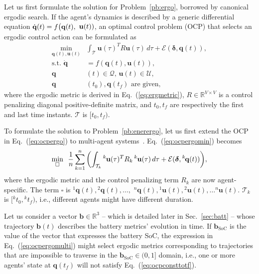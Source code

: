 \documentclass[lettersize,journal,twoside]{IEEEtran}
\theoremstyle{definition}
\begin{document}
Let us first formulate the solution for Problem~\ref{pb:ergo}, borrowed by canonical ergodic search.
If the agent's dynamics is described by a generic differential equation $\dot{\mathbf{q}}(t)=f\big({\small\mathbf{q}(t),}$ ${\small\mathbf{u}(t)})$, an optimal control problem (OCP) that selects an ergodic control action can be formulated as~\cite{ayvali2017ergodic}
\begin{subequations}\label{eq:ocpergo}\begin{align}
  \min_{\mathbf{q}(t),\mathbf{u}(t)}&\int_{\mathcal{T}}\mathbf{u}(\tau)^TR\mathbf{u}(\tau)\,d\tau+{\mathcal{E}(\boldsymbol{\delta},\mathbf{q}(t))},\label{eq:ocpergomin}\\
  \text{s.t. }\dot{\mathbf{q}}&=f(\mathbf{q}(t),\mathbf{u}(t)),\\
  \mathbf{q}&(t)\in\mathcal{Q},\,\mathbf{u}(t)\in\mathcal{U},\\
  \mathbf{q}&(t_0), \mathbf{q}(t_f)\text{ are given},\label{eq:ocpconsttotf}
\end{align}\end{subequations}
where the ergodic metric is derived in Eq.~(\ref{eq:ergmetric}), $R\in\mathbb{R}^{V\times V}$ is a control penalizing diagonal positive-definite matrix, and $t_0, t_f$ are respectively the first and last time instants. 
$\mathcal{T}$ is $[t_0, t_f)$.

To formulate the solution to Problem~\ref{pb:enerergo}, let us first extend the OCP in Eq.~(\ref{eq:ocpergo}) to multi-agent systems~\cite{coffin2022multi}. Eq.~(\ref{eq:ocpergomin}) becomes
\begin{equation}\label{eq:ocpergomulti}
  \min_{\square}\,\,\,{\frac{1}{n}\sum_{k=1}^{n}\left(\int_{\mathcal{T}_k}{}^k\hspace*{-.1ex}\mathbf{u}(\tau)^TR_k\,{}^k\hspace*{-.1ex}\mathbf{u}(\tau)\,d\tau+\mathcal{E}(\boldsymbol{\delta},{}^k\hspace*{-.2ex}\mathbf{q}(t))\right)},
\end{equation}
where the ergodic metric and the control penalizing term $R_k$ are now agent-specific. The term $\square$ is ${}^1\mathbf{q}(t),{}^2\mathbf{q}(t),\dots,$ ${}^n\mathbf{q}(t),{}^1\mathbf{u}(t),{}^2\mathbf{u}(t),\dots{}^n\mathbf{u}(t)$. $\mathcal{T}_k$ is $[{}^kt_0, {}^kt_f)$, i.e., different agents might have different duration.

Let us consider a vector $\mathbf{b}\in\mathbb{R}^3$ -- which is detailed later in Sec.~\ref{sec:batt} -- whose trajectory $\mathbf{b}(t)$ describes the battery metrics' evolution in time. If $\mathbf{b}_{\text{SoC}}$ is the value of the vector that expresses the battery %
SoC, the expression in Eq.~(\ref{eq:ocpergomulti}) might select ergodic metrics corresponding to trajectories that are impossible to traverse in the $\mathbf{b}_{\text{SoC}}\in(0,1]$ domain, i.e., one or more agents' state at $\mathbf{q}(t_f)$ will not satisfy Eq.~(\ref{eq:ocpconsttotf}).
\end{document}
